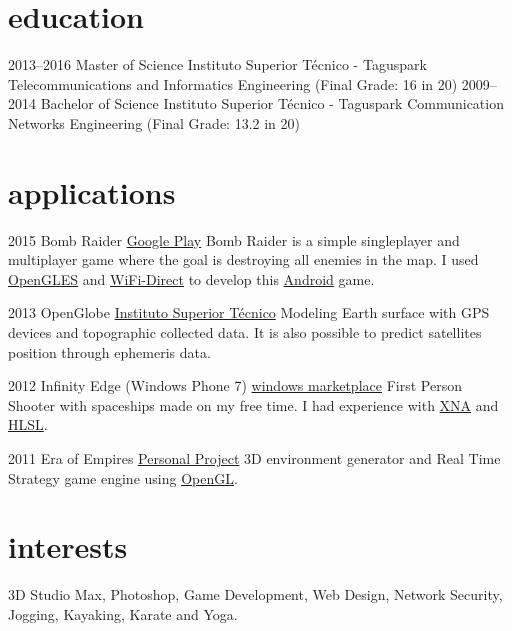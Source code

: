 \documentclass[]{friggeri-cv}
\begin{document}
\section{education}

\begin{entrylist}
   \entry
    {2013–2016}
    {Master of Science}
    {Instituto Superior Técnico - Taguspark}
    {Telecommunications and Informatics Engineering (Final Grade: 16 in 20)}
   \entry
    {2009–2014}
    {Bachelor of Science}
    {Instituto Superior Técnico - Taguspark}
    {Communication Networks Engineering (Final Grade: 13.2 in 20)}

\end{entrylist}



\section{applications}

\begin{entrylist}
  
  \entry
    {2015}
    {Bomb Raider}
    {\href{http://play.google.com/store/apps/details?id=pt.ist.bombraider}{Google Play}}
    {Bomb Raider is a simple singleplayer and multiplayer game where the goal is destroying all enemies in the map. I used \underline{OpenGLES} and \underline{WiFi-Direct} to develop this \underline{Android} game.}

  \entry
    {2013}
    {OpenGlobe}
    {\href{http://web.ist.utl.pt/ist168621/?page=10}{Instituto Superior Técnico}}
    {Modeling Earth surface with GPS devices and topographic collected data. It is also possible to predict satellites position through ephemeris data.}

  \entry
    {2012}
    {Infinity Edge (Windows Phone 7)}
    {\href{http://www.windowsphone.com/en-us/store/app/infinity-edge/05516463-3a89-4351-996e-62e5b4519aeb}{windows marketplace}}
    {First Person Shooter with spaceships made on my free time. I had experience with \underline{XNA} and \underline{HLSL}.}

  \entry
    {2011}
    {Era of Empires}
    {\href{http://web.ist.utl.pt/ist168621/?page=8}{Personal Project}}
    {3D environment generator and Real Time Strategy game engine using \underline{OpenGL}.}


\end{entrylist}

\section{interests}
    3D Studio Max, Photoshop, Game Development, Web Design, Network Security, Jogging, Kayaking, Karate and Yoga.
\end{document}
